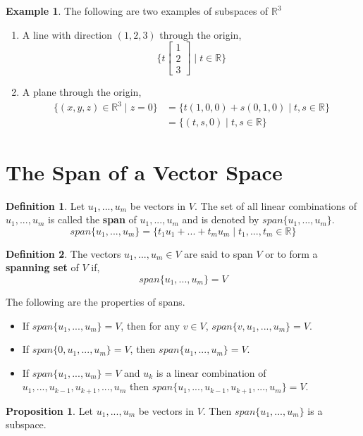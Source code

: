 \documentclass{report}
\theoremstyle{definition}
\newtheorem{_def}{Definition}
\newtheorem{ex}{Example}
\newtheorem{_prop}{Proposition}
\begin{document}
\begin{ex} The following are two examples of subspaces of $\mathbb{R}^3$
\begin{enumerate}
 \item A line with direction $(1,2,3)$ through the origin,
 \[\{t\begin{bmatrix}
 1 \\ 2 \\ 3
 \end{bmatrix} \mid t\in \mathbb{R} \}\]
 \item A plane through the origin,
 \begin{align*}
 \{(x,y,z)\in \mathbb{R}^3\mid z=0\}
 &=\{t(1,0,0)+s(0,1,0)\mid t,s\in \mathbb{R}\} \\
 &=\{(t,s,0)\mid t,s\in \mathbb{R}\}
 \end{align*}

\end{enumerate}
\end{ex}

\section{The Span of a Vector Space}

\begin{_def}
Let $u_1,...,u_m$ be vectors in $V$.
The set of all linear combinations of $u_1,...,u_m$ is called the \textbf{span} of $u_1,...,u_m$ and is denoted by $span\{u_1,...,u_m\}$.
\[span\{u_1,...,u_m\}=\{t_1u_1+...+t_mu_m\mid t_1,...,t_m\in \mathbb{R}\}\]
\end{_def}

\begin{_def}
The vectors $u_1,...,u_m\in V$ are said to span $V$ or to form a \textbf{spanning set} of $V$ if,
\[span\{u_1,...,u_m\}=V\]
\end{_def}

The following are the properties of spans.
\begin{itemize}
 \item If $span\{u_1,...,u_m\}=V$, then for any $v\in V$, $span\{v,u_1,...,u_m\}=V$.
 \item If $span\{0,u_1,...,u_m\}=V$, then $span\{u_1,...,u_m\}=V$.
 \item If $span\{u_1,...,u_m\}=V$ and $u_k$ is a linear combination of $u_1,...,u_{k-1},u_{k+1},...,u_m$ then $span\{u_1,...,u_{k-1},u_{k+1},...,u_m\}=V$.
\end{itemize}

\begin{_prop}
Let $u_1,...,u_m$ be vectors in $V$.
Then $span\{u_1,...,u_m\}$ is a subspace.
\end{_prop}
\end{document}
